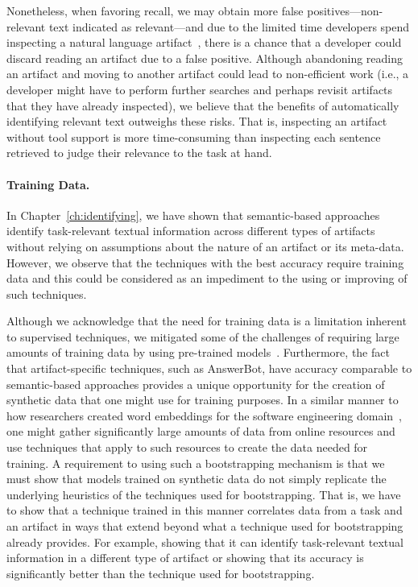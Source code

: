 Nonetheless, when favoring recall,  we may obtain more false positives---non-relevant text indicated as relevant---and
due to the limited time developers spend inspecting a natural language artifact~\cite{Starke2009}, there is a chance that
 a developer could discard reading an artifact due to a false positive. 
 Although abandoning reading an artifact and moving to another artifact could lead to non-efficient work
 (i.e., a developer might have to perform further searches and perhaps revisit artifacts that they have already inspected),
we believe that the benefits of automatically identifying relevant text outweighs these risks. 
That is, inspecting an artifact without tool support is more time-consuming
than inspecting each sentence retrieved to judge their relevance to the task at hand. 




\paragraph{\textbf{Training Data.}}


In Chapter~\ref{ch:identifying}, we have shown that semantic-based approaches identify task-relevant textual information across
different types of artifacts without relying on
assumptions about the nature of an artifact or its meta-data.
However, we
observe that the techniques with the best accuracy require training data
and this could be considered as an impediment to the using or improving of such  techniques. 



Although we acknowledge that the need for training data is a limitation inherent to supervised techniques,
we mitigated some of the challenges of requiring large amounts of training data by using pre-trained models~\cite{erhan2010pre-train}.
Furthermore, the fact that artifact-specific techniques, such as AnswerBot, have accuracy comparable to semantic-based approaches
 provides
a unique opportunity for the creation of synthetic data that one might use for training purposes.
In a similar manner to how researchers created word embeddings for the software engineering domain~\cite{Efstathiou2018}, one might gather significantly large amounts of data from online resources
and use techniques that apply to such resources to create the data needed for training.
A requirement to using such a bootstrapping mechanism is that we must show that models trained on synthetic data do not simply replicate the underlying heuristics of the techniques used for bootstrapping. That is, we have to show that a technique trained
in this manner correlates data from a task and an artifact in ways that
extend beyond what a technique used for bootstrapping already provides. For example, showing that
it can identify task-relevant textual information in a different type of artifact or showing
that its accuracy is significantly better than the technique used for bootstrapping.



